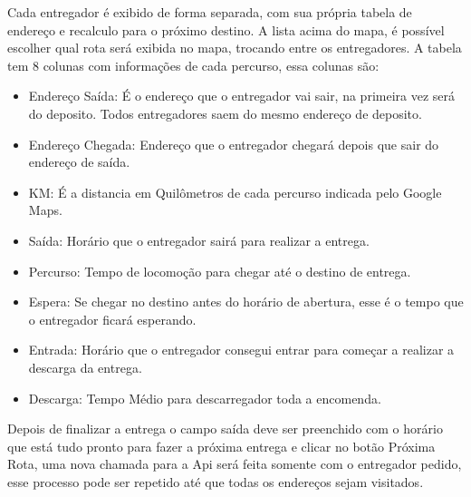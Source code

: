 Cada entregador é exibido de forma separada, com sua própria tabela de endereço e recalculo para o próximo destino. A lista acima do mapa, é possível escolher qual rota será exibida no mapa, trocando entre os entregadores.
A tabela tem 8 colunas com informações de cada percurso, essa colunas são:
\begin{itemize}
	\item Endereço Saída: É o endereço que o entregador vai sair, na primeira vez será do deposito. Todos entregadores saem do mesmo endereço de deposito.
	\item Endereço Chegada: Endereço que o entregador chegará depois que sair do endereço de saída.
	\item KM: É a distancia em Quilômetros de cada percurso indicada pelo Google Maps.
	\item Saída: Horário que o entregador sairá para realizar a entrega.
	\item Percurso: Tempo de locomoção para chegar até o destino de entrega.
	\item Espera: Se chegar no destino antes do horário de abertura, esse é o tempo que o entregador ficará esperando.
	\item Entrada: Horário que o entregador consegui entrar para começar a realizar a descarga da entrega.
	\item Descarga: Tempo Médio para descarregador toda a encomenda.
\end{itemize}
Depois de finalizar a entrega o campo saída deve ser preenchido com o horário que está tudo pronto para fazer a próxima entrega e clicar no botão Próxima Rota, uma nova chamada para a Api será feita somente com o entregador pedido, esse processo pode ser repetido até que todas os endereços sejam visitados.
